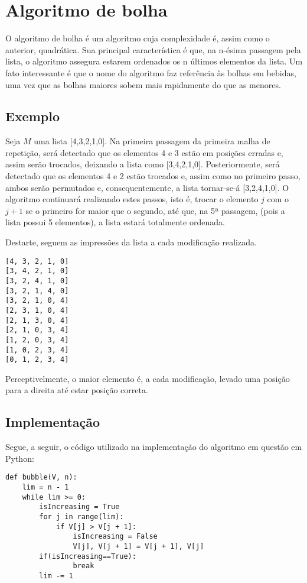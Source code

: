 \section{Algoritmo de bolha}
O algoritmo de bolha é um algoritmo cuja complexidade é, assim como o anterior, quadrática. Sua principal característica é que, na n-ésima passagem pela lista, o algoritmo assegura estarem ordenados os n últimos elementos da lista.
Um fato interessante é que o nome do algoritmo faz referência às bolhas em bebidas, uma vez que as bolhas maiores sobem mais rapidamente do que as menores.


\subsection{Exemplo}
Seja $M$ uma lista [4,3,2,1,0].
Na primeira passagem da primeira malha de repetição, será detectado que os elementos 4 e 3 estão em posições erradas e, assim serão trocados, deixando a lista como [3,4,2,1,0]. Posteriormente, será detectado que os elementos 4 e 2 estão trocados e, assim como no primeiro passo, ambos serão permutados e, consequentemente, a lista tornar-se-á [3,2,4,1,0].
O algoritmo continuará realizando estes passos, isto é, trocar o elemento $j$ com o $j+1$ se o primeiro for maior que o segundo, até que, na 5ª passagem, (pois a lista possui 5 elementos), a lista estará totalmente ordenada.

Destarte, seguem as impressões da lista a cada modificação realizada. 

\begin{lstlisting}
[4, 3, 2, 1, 0]
[3, 4, 2, 1, 0]
[3, 2, 4, 1, 0]
[3, 2, 1, 4, 0]
[3, 2, 1, 0, 4]
[2, 3, 1, 0, 4]
[2, 1, 3, 0, 4]
[2, 1, 0, 3, 4]
[1, 2, 0, 3, 4]
[1, 0, 2, 3, 4]
[0, 1, 2, 3, 4]
\end{lstlisting}

Perceptivelmente, o maior elemento é, a cada modificação, levado uma posição para a direita até estar posição correta. 
\newpage
\subsection{Implementação}
Segue, a seguir, o código utilizado na implementação do algoritmo em questão em Python:

\begin{lstlisting}
def bubble(V, n):
    lim = n - 1
    while lim >= 0:
        isIncreasing = True
        for j in range(lim):
            if V[j] > V[j + 1]:
                isIncreasing = False
                V[j], V[j + 1] = V[j + 1], V[j]
        if(isIncreasing==True): 
                break
        lim -= 1
\end{lstlisting}



